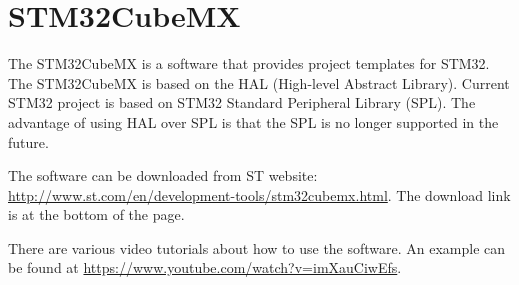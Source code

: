 \documentclass[idxtotoc,hyperref,openany]{labbook} %
\begin{document}
\section{STM32CubeMX}
The STM32CubeMX is a software that provides project templates for STM32. The STM32CubeMX is based on the HAL (High-level Abstract Library). Current STM32 project is based on STM32 Standard Peripheral Library (SPL). The advantage of using HAL over SPL is that the SPL is no longer supported in the future. 
 
The software can be downloaded from ST website: \url{http://www.st.com/en/development-tools/stm32cubemx.html}. The download link is at the bottom of the page. 

There are various video tutorials about how to use the software. An example can be found at \url{https://www.youtube.com/watch?v=imXauCiwEfs}.  
\end{document}
